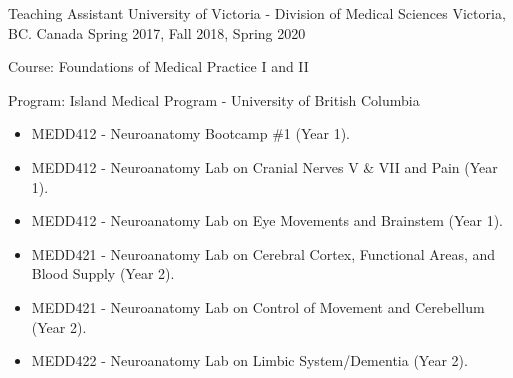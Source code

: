 

\begin{cventries}

  \cventry
    {Teaching Assistant} %
    {University of Victoria - Division of Medical Sciences} %
    {Victoria, BC. Canada} %
    {Spring 2017, Fall 2018, Spring 2020} %
    {
      \begin{cvitems} %
        \item {Course: Foundations of Medical Practice I and II}
        \item {Program: Island Medical Program - University of British Columbia}
        \begin{itemize}
          \begin{itemize}
            \item MEDD412 - Neuroanatomy Bootcamp \#1 (Year 1).
            \item MEDD412 - Neuroanatomy Lab on Cranial Nerves V \& VII and Pain (Year 1).
            \item MEDD412 - Neuroanatomy Lab on Eye Movements and Brainstem (Year 1).
            \item MEDD421 - Neuroanatomy Lab on Cerebral Cortex, Functional Areas, and Blood Supply (Year 2).
            \item MEDD421 - Neuroanatomy Lab on Control of Movement and Cerebellum (Year 2).
            \item MEDD422 - Neuroanatomy Lab on Limbic System/Dementia (Year 2).
            \end{itemize}
        \end{itemize}
      \end{cvitems}
    }
 
\end{cventries}
